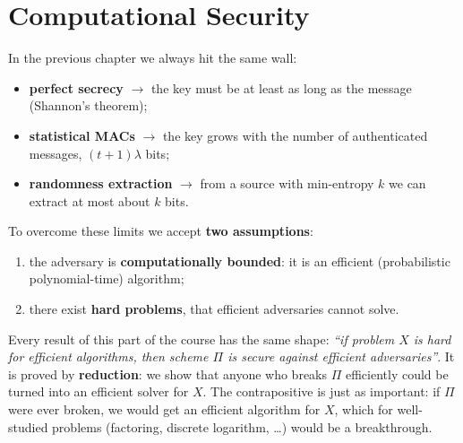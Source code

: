 \chapter{Computational Security}

In the previous chapter we always hit the same wall:
\begin{itemize}
  \item \textbf{perfect secrecy} $\to$ the key must be at least as long as the message (Shannon's theorem);
  \item \textbf{statistical MACs} $\to$ the key grows with the number of authenticated messages, $(t+1)\lambda$ bits;
  \item \textbf{randomness extraction} $\to$ from a source with min-entropy $k$ we can extract at most about $k$ bits.
\end{itemize}

To overcome these limits we accept \textbf{two assumptions}:
\begin{enumerate}
  \item the adversary is \textbf{computationally bounded}: it is an efficient (probabilistic polynomial-time) algorithm;
  \item there exist \textbf{hard problems}, that efficient adversaries cannot solve.
\end{enumerate}

Every result of this part of the course has the same shape: \textit{``if problem $X$ is hard for efficient algorithms, then scheme $\Pi$ is secure against efficient adversaries''}. It is proved by \textbf{reduction}: we show that anyone who breaks $\Pi$ efficiently could be turned into an efficient solver for $X$. The contrapositive is just as important: if $\Pi$ were ever broken, we would get an efficient algorithm for $X$, which for well-studied problems (factoring, discrete logarithm, \ldots) would be a breakthrough.





